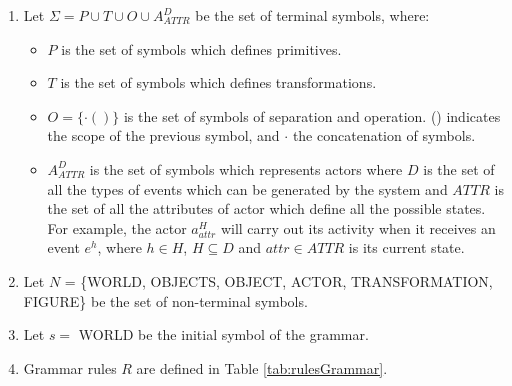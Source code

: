 \begin{enumerate}
    \item Let $\Sigma = P \cup T \cup O \cup A_{ATTR}^D$ be the set of terminal symbols, where:

    \begin{itemize}
        \item $P$ is the set of symbols which defines primitives.

        \item $T$ is the set of symbols which defines transformations.

        \item $O = \{ \cdotp ( ) \}$ is the set of symbols of separation
and operation. () indicates the scope of the previous symbol, and $\cdotp$ the concatenation of
symbols.
        \item $A_{ATTR}^D$ is the set of symbols which represents actors where $D$ is the set of all the types of
        events which can be generated by the system and $ATTR$ is the set of all the attributes of actor which define
        all the possible states. For example, the actor $a_{attr}^H$ will carry out its activity when it receives an
        event $e^h$, where $h \in H$, $H \subseteq D$ and $attr \in ATTR$ is its current state.
    \end{itemize}



    \item Let $N$ = \{WORLD, OBJECTS, OBJECT, ACTOR, TRANSFORMATION,
FIGURE\} be the set of non-terminal symbols.

    \item Let $s =$ WORLD be the initial symbol of the grammar.

    \item Grammar rules $R$ are defined in Table \ref{tab:rulesGrammar}.

\end{enumerate}



